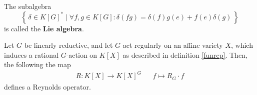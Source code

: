 \begin{remark}
  The subalgebra
  \begin{equation}
    \left\{\, \delta \in K[G]^\ast \mid \forall f,g \in K[G] : \delta (fg) = \delta (f) g(e) + f(e)\delta (g) \,\right\}
  \end{equation}
  is called the \textbf{Lie algebra}.
\end{remark}

\begin{proposition}\label{ro}
  Let $G$ be linearly reductive, and let $G$ act regularly on an affine variety $X$, which induces a rational $G$-action on $K[X]$ as described in definition \ref{funrep}.
  Then, the following the map
  \begin{align}
    R \colon K[X] \longrightarrow K[X]^G && f \mapsto R_G \cdot f
  \end{align}
  defines a Reynolds operator.
\end{proposition}

